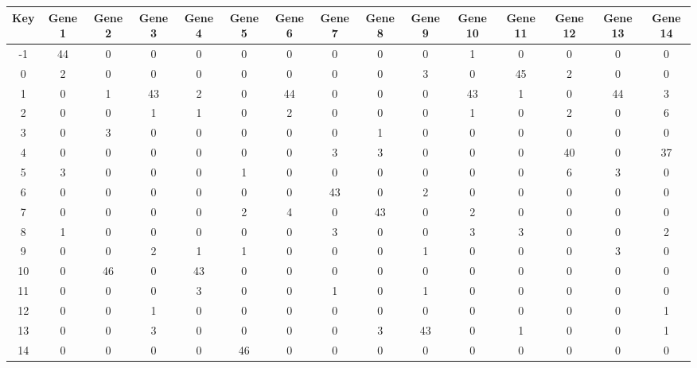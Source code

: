 \begin{tabular}{|c|c|c|c|c|c|c|c|c|c|c|c|c|c|c|}
\hline
Key & Gene 1 & Gene 2 & Gene 3 & Gene 4 & Gene 5 & Gene 6 & Gene 7 & Gene 8 & Gene 9 & Gene 10 & Gene 11 & Gene 12 & Gene 13 & Gene 14 \\
\hline
-1 & 44 & 0 & 0 & 0 & 0 & 0 & 0 & 0 & 0 & 1 & 0 & 0 & 0 & 0 \\
0 & 2 & 0 & 0 & 0 & 0 & 0 & 0 & 0 & 3 & 0 & 45 & 2 & 0 & 0 \\
1 & 0 & 1 & 43 & 2 & 0 & 44 & 0 & 0 & 0 & 43 & 1 & 0 & 44 & 3 \\
2 & 0 & 0 & 1 & 1 & 0 & 2 & 0 & 0 & 0 & 1 & 0 & 2 & 0 & 6 \\
3 & 0 & 3 & 0 & 0 & 0 & 0 & 0 & 1 & 0 & 0 & 0 & 0 & 0 & 0 \\
4 & 0 & 0 & 0 & 0 & 0 & 0 & 3 & 3 & 0 & 0 & 0 & 40 & 0 & 37 \\
5 & 3 & 0 & 0 & 0 & 1 & 0 & 0 & 0 & 0 & 0 & 0 & 6 & 3 & 0 \\
6 & 0 & 0 & 0 & 0 & 0 & 0 & 43 & 0 & 2 & 0 & 0 & 0 & 0 & 0 \\
7 & 0 & 0 & 0 & 0 & 2 & 4 & 0 & 43 & 0 & 2 & 0 & 0 & 0 & 0 \\
8 & 1 & 0 & 0 & 0 & 0 & 0 & 3 & 0 & 0 & 3 & 3 & 0 & 0 & 2 \\
9 & 0 & 0 & 2 & 1 & 1 & 0 & 0 & 0 & 1 & 0 & 0 & 0 & 3 & 0 \\
10 & 0 & 46 & 0 & 43 & 0 & 0 & 0 & 0 & 0 & 0 & 0 & 0 & 0 & 0 \\
11 & 0 & 0 & 0 & 3 & 0 & 0 & 1 & 0 & 1 & 0 & 0 & 0 & 0 & 0 \\
12 & 0 & 0 & 1 & 0 & 0 & 0 & 0 & 0 & 0 & 0 & 0 & 0 & 0 & 1 \\
13 & 0 & 0 & 3 & 0 & 0 & 0 & 0 & 3 & 43 & 0 & 1 & 0 & 0 & 1 \\
14 & 0 & 0 & 0 & 0 & 46 & 0 & 0 & 0 & 0 & 0 & 0 & 0 & 0 & 0 \\
\hline
\end{tabular}